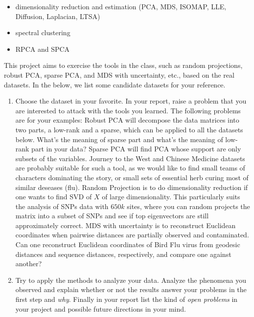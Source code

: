 \documentclass[11pt]{article}
\begin{document}
\begin{itemize}
\item dimensionality reduction and estimation (PCA, MDS, ISOMAP, LLE, Diffusion, Laplacian, LTSA)
\item spectral clustering 
\item RPCA and SPCA  
\end{itemize}

This project aims to exercise the tools in the class, such as random projections, robust PCA, sparse PCA, and MDS with uncertainty, etc., based on the real datasets. In the below, we list some candidate datasets for your reference. 
\begin{enumerate}
\item Choose the dataset in your favorite. In your report, raise a problem that you are interested to attack with the tools you learned. The following problems are for your examples:
\subitem  Robust PCA will decompose the data matrices into two parts, a low-rank and a sparse, which can be applied to all the datasets below. What's the meaning of sparse part and what's the meaning of low-rank part in your data? 
\subitem Sparse PCA will find PCA whose support are only subsets of the variables. Journey to the West and Chinese Medicine datasets are probably suitable for such a tool, as we would like to find small teams of characters dominating the story, or small sets of essential herb curing most of similar deseases (flu). 
\subitem Random Projection is to do dimensionality reduction if one wants to find SVD of $X$ of large dimensionality. This particularly suits the analysis of SNPs data with $650k$ sites, where you can random projects the matrix into a subset of SNPs and see if top eigenvectors are still approximately correct. 
\subitem MDS with uncertainty is to reconstruct Euclidean coordinates when pairwise distances are partially observed and contaminated.  Can one reconstruct Euclidean coordinates of Bird Flu virus from geodesic distances and sequence distances, respectively, and compare one against another?  
\item Try to apply the methods to analyze your data. Analyze the phenomena you observed and explain whether or not the results answer your problems in the first step and \emph{why}. Finally in your report list the kind of \emph{open problems} in your project and possible future directions in your mind. 
\end{enumerate}
\end{document}
